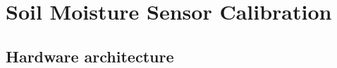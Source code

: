 \chapter{Soil Moisture Sensor Calibration}
\label{chap:soil-cal}



\section{Hardware architecture}
